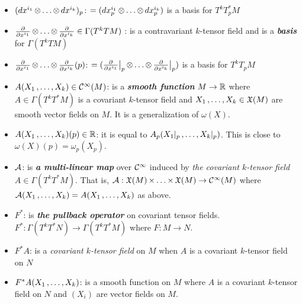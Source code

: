\documentclass[11pt]{article}
\begin{document}
\begin{itemize}
\item $(dx^{i_1} \,{\otimes}\ldots{\otimes}\, dx^{i_k})_p$: \quad $=(dx_p^{i_1} \,{\otimes}\ldots{\otimes}\, dx_p^{i_k})$ is a basis for $T^{k}T_{p}^{*}M$

\item $\frac{\partial }{ \partial x^{i_1}} \,{\otimes}\ldots{\otimes}\, \frac{\partial }{ \partial x^{i_k}} \in \Gamma(T^{k}TM)$ : \quad is a contravariant $k$-tensor field and is a \emph{\textbf{basis}} for $\Gamma(T^{k}TM)$

\item $\frac{\partial }{ \partial x^{i_1}} \,{\otimes}\ldots{\otimes}\, \frac{\partial }{ \partial x^{i_k}}(p)$: \quad $=(\frac{\partial }{ \partial x^{i_1}}\big|_{p} \,{\otimes}\ldots{\otimes}\, \frac{\partial }{ \partial x^{i_k}}\big|_{p})$ is a basis for $T^{k}T_{p}M$

\item $A(X_1 \,{,}\ldots{,}\, X_k) \in {\mathcal C}^{\infty}(M)$: \quad is a \emph{\textbf{smooth function}} $M \rightarrow {\mathbb R}$ where $A \in \Gamma(T^{k}T^{*}M)$ is a covariant $k$-tensor field and $X_1 \,{,}\ldots{,}\, X_k \in {\mathfrak X}(M)$ are smooth vector fields on $M$. It is a generalization of $\omega(X)$.

\item $A(X_1 \,{,}\ldots{,}\, X_k)(p) \in {\mathbb R}$: \quad it is equal to $A_p(X_1|_{p} \,{,}\ldots{,}\, X_k|_{p})$. This is close to $\omega(X)(p) = \omega_p(X_p)$.

\item ${\mathcal A}$: \quad is \emph{\textbf{a multi-linear map}} over ${\mathcal C}^{\infty}$ induced by \emph{the covariant $k$-tensor field} $A \in \Gamma(T^{k}T^{*}M)$. That is,  ${\mathcal A}: {\mathfrak X}(M) \,{\times}\ldots{\times}\, {\mathfrak X}(M) \rightarrow  {\mathcal C}^{\infty}(M)$ where ${\mathcal A}(X_1 \,{,}\ldots{,}\, X_k) = A(X_1 \,{,}\ldots{,}\, X_k)$ as above.

\item $F^{*}$: \quad is \emph{\textbf{the pullback operator}} on covariant tensor fields. $F^{*}: \Gamma(T^{k}T^{*}N) \rightarrow \Gamma(T^{k}T^{*}M)$ where $F: M\rightarrow N$.

\item $F^{*}A$: \quad is a \emph{covariant $k$-tensor field} on $M$ when $A$ is a covariant $k$-tensor field on $N$

\item $F^{*}A(X_1 \,{,}\ldots{,}\, X_k)$: \quad is a smooth function on $M$ where $A$ is a covariant $k$-tensor field on $N$ and $(X_i)$ are vector fields on $M$.
\end{itemize}
\end{document}
